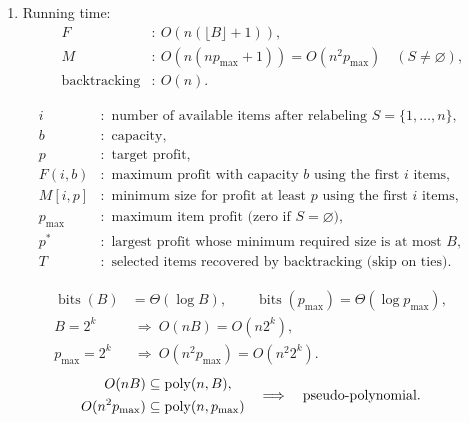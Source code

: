 \documentclass[12pt,a4paper]{article}
\begin{document}
\begin{definition}
\begin{enumerate}
\[\begin{aligned}
&\text{while }i>0:\quad
(i,b,T)\leftarrow
\begin{cases}
(i-1,b,T),&F(i,b)=F(i-1,b),\\[3pt]
(i-1,b-s_i,T\cup\{i\}),&F(i,b)>F(i-1,b).
\end{cases}
\end{aligned}
\]
\[
\begin{aligned}
&M:\quad(i,p,T)\leftarrow(n,p^*,\varnothing),\\[3pt]
&\text{while }i>0:\quad
(i,p,T)\leftarrow
\begin{cases}
(i-1,p,T),&M[i,p]=M[i-1,p],\\[3pt]
(i-1,\max\{0,p-p_i\},T\cup\{i\}),&M[i,p]<M[i-1,p].
\end{cases}
\end{aligned}
\]
\[
\text{return }T\in\mathcal S_I.
\]
\item Running time:
\[
\begin{aligned}
F&:\ O\!\left(n(\lfloor B\rfloor+1)\right),\\
M&:\ O\!\left(n(np_{\max}+1)\right)=O(n^2p_{\max})\quad(S\neq\varnothing),\\
\text{backtracking}&:\ O(n).
\end{aligned}
\]
\end{enumerate}
\[
\begin{aligned}
i&:\text{ number of available items after relabeling }S=\{1,\ldots,n\},\\
b&:\text{ capacity},\\
p&:\text{ target profit},\\
F(i,b)&:\text{ maximum profit with capacity }b\text{ using the first }i\text{ items},\\
M[i,p]&:\text{ minimum size for profit at least }p\text{ using the first }i\text{ items},\\
p_{\max}&:\text{ maximum item profit (zero if }S=\varnothing\text{)},\\
p^*&:\text{ largest profit whose minimum required size is at most }B,\\
T&:\text{ selected items recovered by backtracking (skip on ties)}.
\end{aligned}
\]
\end{definition}

\begin{remark}
\[
\begin{aligned}
\operatorname{bits}(B)&=\Theta(\log B),\qquad
\operatorname{bits}(p_{\max})=\Theta(\log p_{\max}),\\[3pt]
B=2^k&\ \Longrightarrow\ O(nB)=O(n2^k),\\
p_{\max}=2^k&\ \Longrightarrow\ O(n^2p_{\max})=O(n^2 2^k).
\end{aligned}
\]
\[
\begin{aligned}
O(nB)&\subseteq\operatorname{poly}(n,B),\\
O(n^2p_{\max})&\subseteq\operatorname{poly}(n,p_{\max})
\end{aligned}
\quad\Longrightarrow\quad\text{pseudo-polynomial}.
\]
\end{remark}
\end{document}

